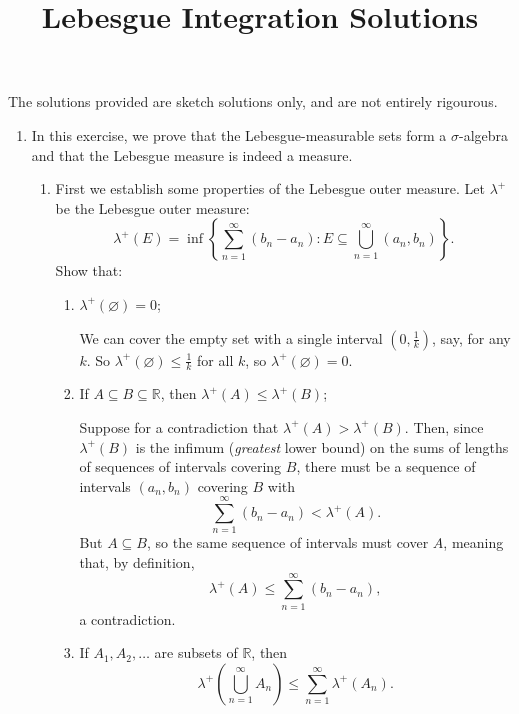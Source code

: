 \documentclass{article}
\begin{document}
\title{Lebesgue Integration Solutions}
\date{}

\maketitle
\thispagestyle{empty}

\Large



The solutions provided are sketch solutions only, and are not entirely rigourous.



\begin{enumerate}
	\item In this exercise, we prove that the Lebesgue-measurable sets form a $\sigma$-algebra and that the Lebesgue measure is indeed a measure.
		\begin{enumerate}
			\item First we establish some properties of the Lebesgue outer measure. Let $\lambda^+$ be the Lebesgue outer measure:
				\[\lambda^+(E)=\inf\left\{\sum_{n=1}^\infty (b_n-a_n):E\subseteq \bigcup_{n=1}^\infty (a_n,b_n)\right\}.\]
				Show that:
				\begin{enumerate}
					\item $\lambda^+(\varnothing)=0$;
						
						{\color{blue}
							We can cover the empty set with a single interval $\left(0,\frac{1}{k}\right)$, say, for any $k$. So $\lambda^+(\varnothing)\leq \frac{1}{k}$ for all $k$, so $\lambda^+(\varnothing)=0$.
						}
					
					\item If $A\subseteq B\subseteq \mathbb{R}$, then $\lambda^+(A)\leq\lambda^+(B)$;
					
						{\color{blue}
							Suppose for a contradiction that $\lambda^+(A)> \lambda^+(B)$. Then, since $\lambda^+(B)$ is the infimum (\textit{greatest} lower bound) on the sums of lengths of sequences of intervals covering $B$, there must be a sequence of intervals $(a_n,b_n)$ covering $B$ with
							\[\sum_{n=1}^\infty (b_n-a_n) < \lambda^+(A).\]
							But $A\subseteq B$, so the same sequence of intervals must cover $A$, meaning that, by definition,
							\[\lambda^+(A)\leq\sum_{n=1}^\infty (b_n-a_n),\]
							a contradiction.
						}
					
					\item If $A_1,A_2,\hdots$ are subsets of $\mathbb{R}$, then
						\[\lambda^+\left(\bigcup_{n=1}^\infty A_n\right) \leq \sum_{n=1}^\infty \lambda^+ (A_n).\]
						

\end{enumerate}
\end{enumerate}
\end{enumerate}
\end{document}
